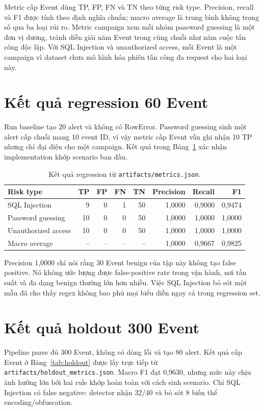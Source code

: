 Metric cấp Event dùng TP, FP, FN và TN theo từng risk type. Precision, recall
và F1 được tính theo định nghĩa chuẩn; macro average là trung bình không trọng
số qua ba loại rủi ro. Metric campaign xem mỗi nhóm password guessing là một
đơn vị dương, tránh diễn giải năm Event trong cùng chuỗi như năm cuộc tấn công
độc lập. Với SQL Injection và unauthorized access, mỗi Event là một campaign
vì dataset chưa mô hình hóa phiên tấn công đa request cho hai loại này.

\section{Kết quả regression 60 Event}

Run baseline tạo 20 alert và không có RowError. Password guessing sinh một
alert cấp chuỗi mang 10 event ID, vì vậy metric cấp Event vẫn ghi nhận 10 TP
nhưng chỉ đại diện cho một campaign. Kết quả trong
Bảng~\ref{tab:baseline} xác nhận implementation khớp scenario ban đầu.

\begin{table}[htbp]
\centering
\begin{tabular}{lrrrrrrr}
\toprule
Risk type & TP & FP & FN & TN & Precision & Recall & F1 \\
\midrule
SQL Injection & 9 & 0 & 1 & 50 & 1,0000 & 0,9000 & 0,9474 \\
Password guessing & 10 & 0 & 0 & 50 & 1,0000 & 1,0000 & 1,0000 \\
Unauthorized access & 10 & 0 & 0 & 50 & 1,0000 & 1,0000 & 1,0000 \\
Macro average & -- & -- & -- & -- & 1,0000 & 0,9667 & 0,9825 \\
\bottomrule
\end{tabular}
\caption{Kết quả regression từ \texttt{artifacts/metrics.json}.}
\label{tab:baseline}
\end{table}

Precision 1,0000 chỉ nói rằng 30 Event benign của tập này không tạo false
positive. Nó không ước lượng được false-positive rate trong vận hành, nơi tần
suất và đa dạng benign thường lớn hơn nhiều. Việc SQL Injection bỏ sót một mẫu
đã cho thấy regex không bao phủ mọi biểu diễn ngay cả trong regression set.

\section{Kết quả holdout 300 Event}

Pipeline parse đủ 300 Event, không có dòng lỗi và tạo 80 alert. Kết quả cấp
Event ở Bảng~\ref{tab:holdout} được lấy trực tiếp từ
\texttt{artifacts/holdout\_metrics.json}. Macro F1 đạt 0,9630, nhưng mức này
chịu ảnh hưởng lớn bởi hai rule khớp hoàn toàn với cách sinh scenario. Chỉ SQL
Injection có false negative: detector nhận 32/40 và bỏ sót 8 biến thể
encoding/obfuscation.


